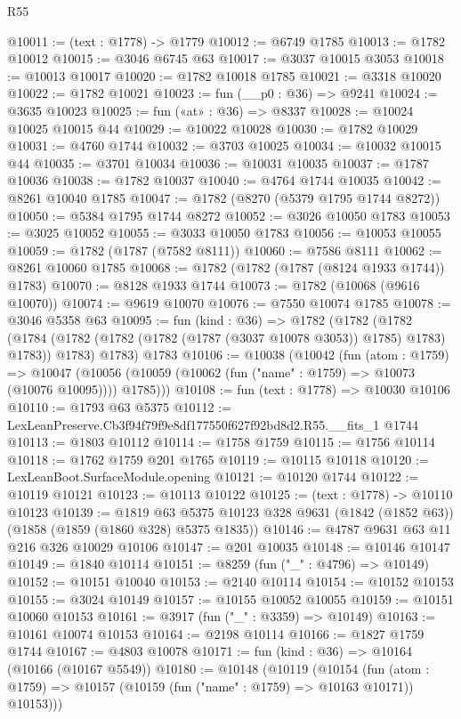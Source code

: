 \begin{lexlean}{R55}
\begin{coremodule}
@10011 := (text : @1778) -> @1779
@10012 := @6749 @1785
@10013 := @1782 @10012
@10015 := @3046 @6745 @63
@10017 := @3037 @10015 @3053
@10018 := @10013 @10017
@10020 := @1782 @10018 @1785
@10021 := @3318 @10020
@10022 := @1782 @10021
@10023 := fun (__p0 : @36) => @9241
@10024 := @3635 @10023
@10025 := fun («at» : @36) => @8337
@10028 := @10024 @10025 @10015 @44
@10029 := @10022 @10028
@10030 := @1782 @10029
@10031 := @4760 @1744
@10032 := @3703 @10025
@10034 := @10032 @10015 @44
@10035 := @3701 @10034
@10036 := @10031 @10035
@10037 := @1787 @10036
@10038 := @1782 @10037
@10040 := @4764 @1744 @10035
@10042 := @8261 @10040 @1785
@10047 := @1782 (@8270 (@5379 @1795 @1744 @8272))
@10050 := @5384 @1795 @1744 @8272
@10052 := @3026 @10050 @1783
@10053 := @3025 @10052
@10055 := @3033 @10050 @1783
@10056 := @10053 @10055
@10059 := @1782 (@1787 (@7582 @8111))
@10060 := @7586 @8111
@10062 := @8261 @10060 @1785
@10068 := @1782 (@1782 (@1787 (@8124 @1933 @1744)) @1783)
@10070 := @8128 @1933 @1744
@10073 := @1782 (@10068 (@9616 @10070))
@10074 := @9619 @10070
@10076 := @7550 @10074 @1785
@10078 := @3046 @5358 @63
@10095 := fun (kind : @36) =>
  @1782
    (@1782
      (@1782 (@1784 (@1782 (@1782 (@1782 (@1787 (@3037 @10078 @3053)) @1785) @1783) @1783)) @1783)
      @1783)
    @1783
@10106 := @10038
    (@10042
      (fun (atom : @1759) =>
      @10047 (@10056 (@10059 (@10062 (fun ("name" : @1759) => @10073 (@10076 @10095)))) @1785)))
@10108 := fun (text : @1778) => @10030 @10106
@10110 := @1793 @63 @5375
@10112 := LexLeanPreserve.Cb3f94f79f9e8df177550f627f92bd8d2.R55.__fits_1 @1744
@10113 := @1803 @10112
@10114 := @1758 @1759
@10115 := @1756 @10114
@10118 := @1762 @1759 @201 @1765
@10119 := @10115 @10118
@10120 := LexLeanBoot.SurfaceModule.opening
@10121 := @10120 @1744
@10122 := @10119 @10121
@10123 := @10113 @10122
@10125 := (text : @1778) -> @10110 @10123
@10139 := @1819
    @63
    @5375
    @10123
    @328
    @9631
    (@1842 (@1852 @63))
    (@1858 (@1859 (@1860 @328) @5375 @1835))
@10146 := @4787 @9631 @63 @11 @216 @326 @10029 @10106
@10147 := @201 @10035
@10148 := @10146 @10147
@10149 := @1840 @10114
@10151 := @8259 (fun ("_" : @4796) => @10149)
@10152 := @10151 @10040
@10153 := @2140 @10114
@10154 := @10152 @10153
@10155 := @3024 @10149
@10157 := @10155 @10052 @10055
@10159 := @10151 @10060 @10153
@10161 := @3917 (fun ("_" : @3359) => @10149)
@10163 := @10161 @10074 @10153
@10164 := @2198 @10114
@10166 := @1827 @1759 @1744
@10167 := @4803 @10078
@10171 := fun (kind : @36) => @10164 (@10166 (@10167 @5549))
@10180 := @10148
    (@10119
      (@10154
        (fun (atom : @1759) => @10157 (@10159 (fun ("name" : @1759) => @10163 @10171)) @10153)))

\end{coremodule}
\end{lexlean}
